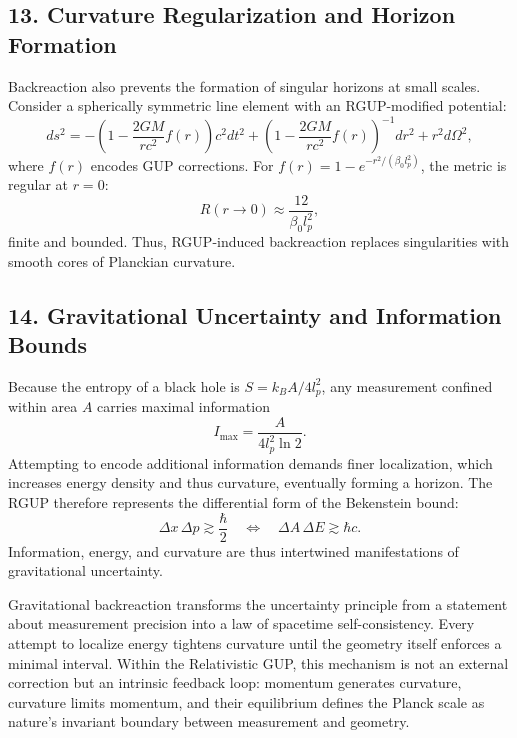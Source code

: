 \documentclass[11pt,oneside]{book}
\newenvironment{booknote}{
  \begin{tcolorbox}[
    colback=gray!3!white,
    colframe=gray!45!black,
    fonttitle=\bfseries,
    title=\textbf{Book Note},
  ]
}{\end{tcolorbox}}
\numberwithin{equation}{chapter}
\newcommand{\betaz}{\beta_0}
\begin{document}
\subsection*{13. Curvature Regularization and Horizon Formation}

Backreaction also prevents the formation of singular horizons at small scales.  
Consider a spherically symmetric line element with an RGUP-modified potential:
\begin{equation}
ds^2 = -\left(1 - \frac{2GM}{r c^2}f(r)\right)c^2dt^2
+ \left(1 - \frac{2GM}{r c^2}f(r)\right)^{-1}dr^2
+ r^2 d\Omega^2,
\end{equation}
where $f(r)$ encodes GUP corrections.  
For $f(r) = 1 - e^{-r^2/(\betaz l_p^2)}$, the metric is regular at $r=0$:
\begin{equation}
R(r\!\to\!0) \approx \frac{12}{\betaz l_p^2},
\end{equation}
finite and bounded.  
Thus, RGUP-induced backreaction replaces singularities with smooth cores of Planckian curvature.

\subsection*{14. Gravitational Uncertainty and Information Bounds}

Because the entropy of a black hole is $S = k_B A/4l_p^2$, any measurement confined within area $A$ carries maximal information
\begin{equation}
I_{\max} = \frac{A}{4l_p^2 \ln 2}.
\end{equation}
Attempting to encode additional information demands finer localization, which increases energy density and thus curvature, eventually forming a horizon.  
The RGUP therefore represents the differential form of the Bekenstein bound:
\begin{equation}
\Delta x\,\Delta p \gtrsim \frac{\hbar}{2}
\quad\Leftrightarrow\quad
\Delta A\,\Delta E \gtrsim \hbar c.
\end{equation}
Information, energy, and curvature are thus intertwined manifestations of gravitational uncertainty. \vspace{0.8em}

\begin{booknote}
Gravitational backreaction transforms the uncertainty principle from a statement about measurement precision into a law of spacetime self-consistency.  
Every attempt to localize energy tightens curvature until the geometry itself enforces a minimal interval.  
Within the Relativistic GUP, this mechanism is not an external correction but an intrinsic feedback loop: momentum generates curvature, curvature limits momentum, and their equilibrium defines the Planck scale as nature’s invariant boundary between measurement and geometry.
\end{booknote}
\end{document}
